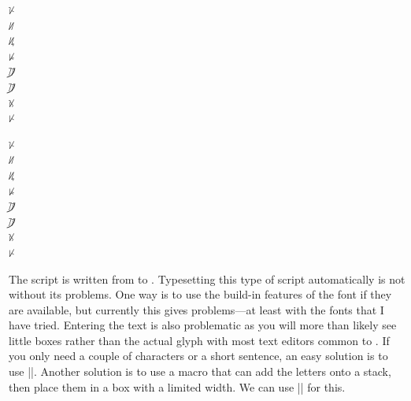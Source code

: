 \begin{minipage}[t]{2cm}
\begin{tcolorbox}[width=2cm,colback=graphicbackground,
boxrule=0pt,toprule=0pt,colframe=white]
\LARGE\hanunoo
ᜩ\\
ᜤ\\
ᜮ\\
ᜥᜳ\\
ᜨ᜴ \\
ᜨ᜴\\
ᜫᜳ\\
ᜥ\\
\end{tcolorbox}
\end{minipage}
\begin{minipage}[t]{2cm}
\begin{tcolorbox}[width=2cm,colback=graphicbackground,
boxrule=0pt,toprule=0pt,colframe=white]
\LARGE\hanunoo
ᜩ\\
ᜤ\\
ᜮ\\
ᜥᜳ\\
ᜨ᜴ \\
ᜨ᜴\\
ᜫᜳ\\
ᜥ\\
\end{tcolorbox}
\end{minipage}
\begin{minipage}[t]{\textwidth-6cm}
The script is written from  to . Typesetting this type of script automatically is not without its problems. One way is to use the build-in features of the font if they are available, but currently this gives problems---at least with the fonts that I have tried. Entering the text is also problematic as you will more than likely see little boxes rather than the actual glyph with most text editors common to \latexe. If you only need a couple of characters or a short sentence, an easy solution is to use |\rotatebox|. Another solution is to use a macro that can add the letters onto a stack, then place them in a box with a limited width. We can use |\@tfor| for this.  
\end{minipage}